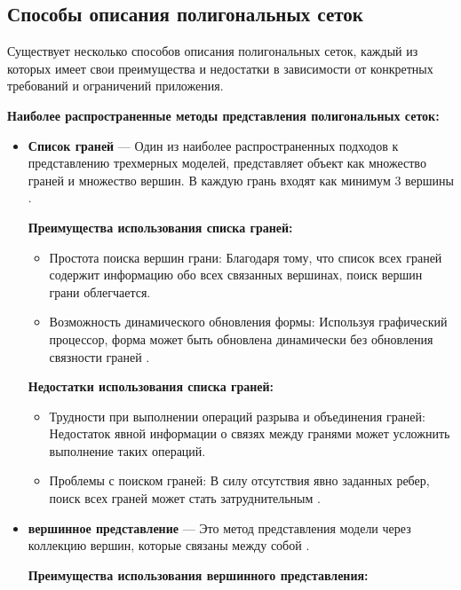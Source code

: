 \subsection{Способы описания полигональных сеток}

Существует несколько способов описания полигональных сеток, каждый из которых имеет свои преимущества и недостатки в зависимости от конкретных требований и ограничений приложения.

 \textbf{Наиболее распространенные методы представления полигональных сеток:}
 
	\begin{itemize}
    \item \textbf{Список граней} ---  Один из наиболее распространенных подходов к представлению трехмерных моделей, представляет объект как множество граней и множество вершин. В каждую грань входят как минимум 3 вершины \cite{polygon_mesh}.
    
  \textbf{Преимущества использования списка граней:}
  
	\begin{itemize}
		\item Простота поиска вершин грани: Благодаря тому, что список всех граней содержит информацию обо всех связанных вершинах, поиск вершин грани облегчается.
		\item Возможность динамического обновления формы: Используя графический процессор, форма может быть обновлена динамически без обновления связности граней \cite{polygon_mesh}.
		\end{itemize}
		
	\textbf{Недостатки использования списка граней:}
	
	\begin{itemize}
	\item Трудности при выполнении операций разрыва и объединения граней: Недостаток явной информации о связях между гранями может усложнить выполнение таких операций.
	\item Проблемы с поиском граней: В силу отсутствия явно заданных ребер, поиск всех граней может стать затруднительным \cite{polygon_mesh}.
	\end{itemize}
	
	\item \textbf{вершинное представление} --- Это метод представления модели через коллекцию вершин, которые связаны между собой \cite{polygon_mesh}.

	\textbf{Преимущества использования вершинного представления:}
	

\end{itemize}
